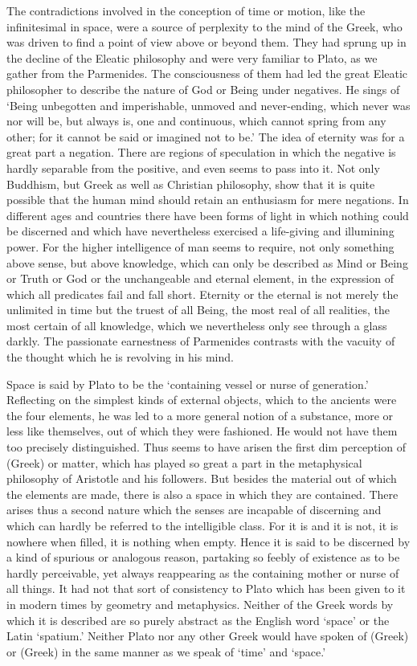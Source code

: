 \documentclass[11pt,letter]{article}
\begin{document}
\par  The contradictions involved in the conception of time or motion, like the infinitesimal in space, were a source of perplexity to the mind of the Greek, who was driven to find a point of view above or beyond them. They had sprung up in the decline of the Eleatic philosophy and were very familiar to Plato, as we gather from the Parmenides. The consciousness of them had led the great Eleatic philosopher to describe the nature of God or Being under negatives. He sings of ‘Being unbegotten and imperishable, unmoved and never-ending, which never was nor will be, but always is, one and continuous, which cannot spring from any other; for it cannot be said or imagined not to be.’ The idea of eternity was for a great part a negation. There are regions of speculation in which the negative is hardly separable from the positive, and even seems to pass into it. Not only Buddhism, but Greek as well as Christian philosophy, show that it is quite possible that the human mind should retain an enthusiasm for mere negations. In different ages and countries there have been forms of light in which nothing could be discerned and which have nevertheless exercised a life-giving and illumining power. For the higher intelligence of man seems to require, not only something above sense, but above knowledge, which can only be described as Mind or Being or Truth or God or the unchangeable and eternal element, in the expression of which all predicates fail and fall short. Eternity or the eternal is not merely the unlimited in time but the truest of all Being, the most real of all realities, the most certain of all knowledge, which we nevertheless only see through a glass darkly. The passionate earnestness of Parmenides contrasts with the vacuity of the thought which he is revolving in his mind.

\par  Space is said by Plato to be the ‘containing vessel or nurse of generation.’ Reflecting on the simplest kinds of external objects, which to the ancients were the four elements, he was led to a more general notion of a substance, more or less like themselves, out of which they were fashioned. He would not have them too precisely distinguished. Thus seems to have arisen the first dim perception of (Greek) or matter, which has played so great a part in the metaphysical philosophy of Aristotle and his followers. But besides the material out of which the elements are made, there is also a space in which they are contained. There arises thus a second nature which the senses are incapable of discerning and which can hardly be referred to the intelligible class. For it is and it is not, it is nowhere when filled, it is nothing when empty. Hence it is said to be discerned by a kind of spurious or analogous reason, partaking so feebly of existence as to be hardly perceivable, yet always reappearing as the containing mother or nurse of all things. It had not that sort of consistency to Plato which has been given to it in modern times by geometry and metaphysics. Neither of the Greek words by which it is described are so purely abstract as the English word ‘space’ or the Latin ‘spatium.’ Neither Plato nor any other Greek would have spoken of (Greek) or (Greek) in the same manner as we speak of ‘time’ and ‘space.’
\end{document}
